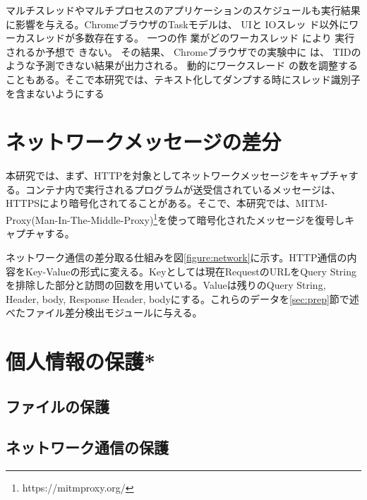 \documentclass[a4paper,twocolumn,10pt]{jarticle}
\begin{document}
マルチスレッドやマルチプロセスのアプリケーションのスケジュールも実行結果に影響を与える。ChromeブラウザのTaskモデルは、 UIと IOスレッ ド以外にワーカスレッドが多数存在する。 一つの作 業がどのワーカスレッド により 実行されるか予想で きない。 その結果、 Chromeブラウザでの実験中に は、 TIDのような予測できない結果が出力される。 動的にワークスレード の数を調整することもある。そこで本研究では、テキスト化してダンプする時にスレッド識別子を含まないようにする

\section{ネットワークメッセージの差分}
\label{sec:net}
本研究では、まず、HTTPを対象としてネットワークメッセージをキャプチャする。コンテナ内で実行されるプログラムが送受信されているメッセージは、HTTPSにより暗号化されてることがある。そこで、本研究では、MITM-Proxy(Man-In-The-Middle-Proxy)\footnote{https://mitmproxy.org/}を使って暗号化されたメッセージを復号しキャプチャする。

ネットワーク通信の差分取る仕組みを図\ref{figure:network}に示す。HTTP通信の内容をKey-Valueの形式に変える。Keyとしては現在RequestのURLをQuery Stringを排除した部分と訪問の回数を用いている。Valueは残りのQuery String, Header, body, Response Header, bodyにする。これらのデータを\ref{sec:prep}節で述べたファイル差分検出モジュールに与える。


\section{個人情報の保護*}
\subsection{ファイルの保護}
\subsection{ネットワーク通信の保護}







 
 
\end{document}
